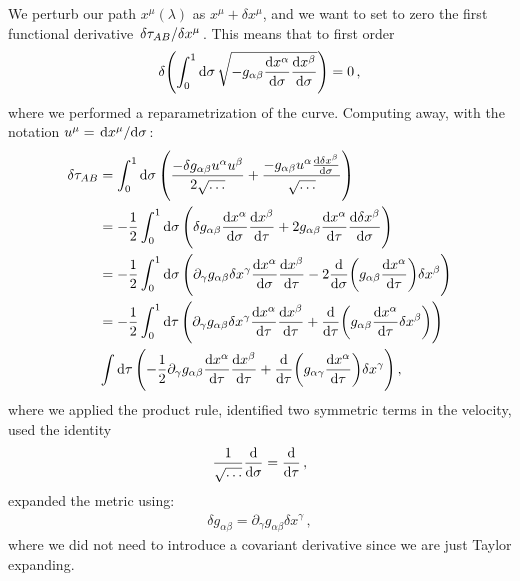 \documentclass[main.tex]{subfiles}
\begin{document}
We perturb our path \(x^{ \mu }(\lambda )\) as \(x^{\mu } + \delta x^{\mu }\), and we want to set to zero the first functional derivative \(\fdv*{\tau_{AB}}{x^{\mu }}\). This means that to first order 
%
\begin{align}
  \delta \qty(\int _{0}^{1} \dd{\sigma }\sqrt{-g_{\alpha \beta } \dv{x^{\alpha }}{\sigma }\dv{x^{\beta }}{\sigma }} )=0
\,,
\end{align}
%
where we performed a reparametrization of the curve. Computing away, with the notation \(u^{\mu } = \dv*{x^{\mu }}{\sigma }\): 
%
\begin{subequations}
\begin{align}
  \delta \tau_{AB} &= \int_0^{1} \dd{\sigma} \qty(
    \frac{{ -\delta g_{ \alpha \beta } u^{\alpha  } u^{\beta }}}{2 \sqrt{\dots}} +
      \frac{-g_{\alpha \beta } u^{\alpha } \dv{ \delta x^{\beta }}{\sigma } }{\sqrt{\dots}}
    )  \\
    &= - \frac{1}{2} \int_0^1  \dd{\sigma } \qty(
        \delta g_{\alpha \beta } \dv{x^{\alpha }}{\sigma }
        \dv{x^{\beta }}{\tau }
        + 2 g_{ \alpha \beta } \dv{x^{\alpha }}{\tau }
        \dv{ \delta x^{\beta }}{\sigma }
    )  \\
    &= - \frac{1}{2} \int_0^1 \dd{\sigma } \qty(
        \partial_{\gamma } g_{\alpha \beta } \delta x^{\gamma } \dv{x^{\alpha }}{\sigma }
        \dv{x^{\beta }}{\tau }
        -2 \dv{}{\sigma } \qty(g_{\alpha \beta } \dv{x^{\alpha }}{\tau }) \delta x^{\beta }
    )  \\
    &= - \frac{1}{2} \int_0^1 \dd{\tau } \qty(
        \partial_{\gamma } g_{\alpha \beta } \delta x^{\gamma } \dv{x^{\alpha }}{\tau } \dv{x^{\beta }}{\tau } +
        \dv{}{\tau } \qty(g_{ \alpha \beta } \dv{x^{\alpha }}{\tau } \delta x^{ \beta } )
    )  \\
    & \int \dd{\tau } \qty(
        -\frac{1}{2} \partial_{\gamma }g_{\alpha \beta } \dv{x^{\alpha }}{\tau } \dv{x^{\beta }}{\tau } + 
        \dv{}{\tau } \qty(g_{\alpha \gamma } \dv{x^{\alpha }}{\tau }) \delta x^{\gamma }
    )
\,,
\end{align}
\end{subequations}
%
where we applied the product rule, identified two symmetric terms in the velocity, used the identity 
%
\begin{align}
  \frac{1}{\sqrt{\dots}} \dv{}{ \sigma } = \dv{}{\tau }
\,,
\end{align}
%
expanded the metric using: 
%
\begin{align}
  \delta g_{\alpha \beta } = \partial_{\gamma } g_{ \alpha \beta } \delta x^{\gamma }
\,,
\end{align}
%
where we did not need to introduce a covariant derivative since we are just Taylor expanding.
\end{document}
